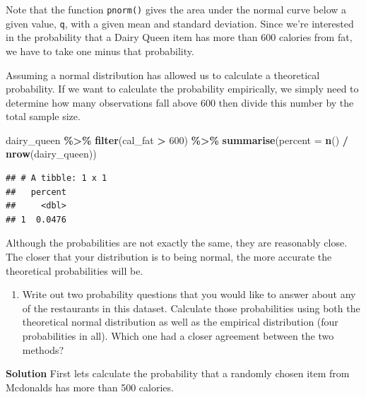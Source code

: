\documentclass[
]{article}
\newenvironment{Shaded}{\begin{snugshade}}{\end{snugshade}}
\newcommand{\AttributeTok}[1]{\textcolor[rgb]{0.13,0.29,0.53}{#1}}
\newcommand{\DecValTok}[1]{\textcolor[rgb]{0.00,0.00,0.81}{#1}}
\newcommand{\FunctionTok}[1]{\textcolor[rgb]{0.13,0.29,0.53}{\textbf{#1}}}
\newcommand{\NormalTok}[1]{#1}
\newcommand{\OtherTok}[1]{\textcolor[rgb]{0.56,0.35,0.01}{#1}}
\newcommand{\SpecialCharTok}[1]{\textcolor[rgb]{0.81,0.36,0.00}{\textbf{#1}}}
\providecommand{\tightlist}{%
  \setlength{\itemsep}{0pt}\setlength{\parskip}{0pt}}
\begin{document}
Note that the function \texttt{pnorm()} gives the area under the normal
curve below a given value, \texttt{q}, with a given mean and standard
deviation. Since we're interested in the probability that a Dairy Queen
item has more than 600 calories from fat, we have to take one minus that
probability.

Assuming a normal distribution has allowed us to calculate a theoretical
probability. If we want to calculate the probability empirically, we
simply need to determine how many observations fall above 600 then
divide this number by the total sample size.

\begin{Shaded}
\begin{Highlighting}[]
\NormalTok{dairy\_queen }\SpecialCharTok{\%\textgreater{}\%} 
  \FunctionTok{filter}\NormalTok{(cal\_fat }\SpecialCharTok{\textgreater{}} \DecValTok{600}\NormalTok{) }\SpecialCharTok{\%\textgreater{}\%}
  \FunctionTok{summarise}\NormalTok{(}\AttributeTok{percent =} \FunctionTok{n}\NormalTok{() }\SpecialCharTok{/} \FunctionTok{nrow}\NormalTok{(dairy\_queen))}
\end{Highlighting}
\end{Shaded}

\begin{verbatim}
## # A tibble: 1 x 1
##   percent
##     <dbl>
## 1  0.0476
\end{verbatim}

Although the probabilities are not exactly the same, they are reasonably
close. The closer that your distribution is to being normal, the more
accurate the theoretical probabilities will be.

\begin{enumerate}
\def\labelenumi{\arabic{enumi}.}
\setcounter{enumi}{5}
\tightlist
\item
  Write out two probability questions that you would like to answer
  about any of the restaurants in this dataset. Calculate those
  probabilities using both the theoretical normal distribution as well
  as the empirical distribution (four probabilities in all). Which one
  had a closer agreement between the two methods?
\end{enumerate}

\textbf{Solution} First lets calculate the probability that a randomly
chosen item from Mcdonalds has more than 500 calories.

\begin{Shaded}
\end{Shaded}
\end{document}

